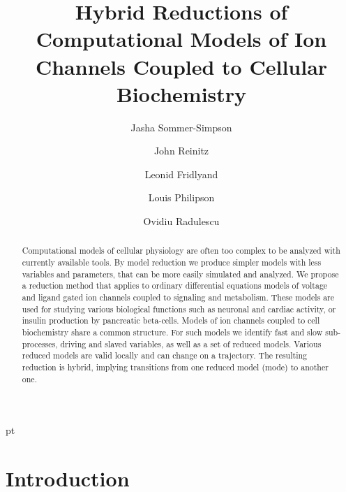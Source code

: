 \documentclass{llncs}
\begin{document}
\abovedisplayskip=3pt
 pt
\abovedisplayshortskip=0pt
\belowdisplayshortskip=0pt

\title{Hybrid Reductions of Computational Models of Ion Channels Coupled
to Cellular Biochemistry}
\author{
Jasha Sommer-Simpson 
\and
John Reinitz 
\and
Leonid Fridlyand 
\and
Louis Philipson 
\and
Ovidiu Radulescu 
}
\maketitle

\sloppy

\begin{abstract}
Computational models of cellular physiology are often too complex to be analyzed with currently available tools. By model
reduction we produce simpler models with less variables and parameters, that can be more easily simulated and
analyzed. We propose a reduction method that applies to ordinary differential equations models of
voltage and ligand gated ion channels coupled to
signaling and metabolism. These models are used for studying various biological functions such as neuronal and cardiac activity, or insulin production by pancreatic beta-cells.
Models of ion channels coupled to cell biochemistry share a common structure. For
such models we identify fast and slow sub-processes, driving and slaved variables,
as well as a set of reduced models.
Various reduced models are valid locally and can change
on a trajectory. The resulting reduction is hybrid, implying transitions from
one reduced model (mode) to another one.
\end{abstract}

\section{Introduction}
\end{document}
